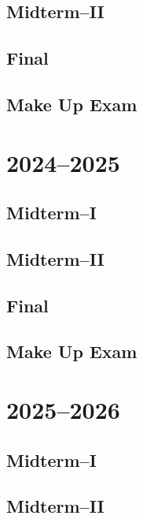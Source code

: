 \documentclass[a4paper,12pt]{book}
\begin{document}
\subsection{Midterm--II}


\subsection{Final}


\subsection{Make Up Exam}


\section{2024--2025}

\subsection{Midterm--I}


\subsection{Midterm--II}


\subsection{Final}


\subsection{Make Up Exam}


\section{2025--2026}

\subsection{Midterm--I}


\subsection{Midterm--II}

\end{document}
